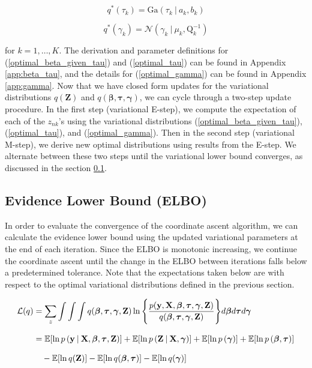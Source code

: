 \documentclass[twoside,11pt]{article}
\newcommand\given[1][]{\:#1\vert\:}
\newcommand{\boldbeta}{\boldsymbol\beta}
\newcommand{\boldgamma}{\boldsymbol\gamma}
\newcommand{\boldtau}{\boldsymbol\tau}
\newcommand{\E}{\mathbb{E}}
\newcommand{\pr}[1]{p \left( #1 \right)}
\begin{document}
\begin{equation} \label{optimal_tau}
	q^{*}(\tau_k) =  \mathrm{Ga}\left( \tau_k \given a_k, b_k \right)
\end{equation}

\begin{equation} \label{optimal_gamma}
	q^{*}(\gamma_k) = \mathcal{N} \left( \gamma_k \given \mu_k, \mathrm{Q}_k^{-1} \right)
\end{equation}

for $k = 1, \ldots, K$. The derivation and parameter definitions for (\ref{optimal_beta_given_tau}) and (\ref{optimal_tau}) can be found in Appendix \ref{app:beta_tau}, and the details for (\ref{optimal_gamma}) can be found in Appendix \ref{app:gamma}. Now that we have closed form updates for the variational distributions $q(\mathbf{Z})$ and $q(\boldbeta, \boldtau, \boldgamma)$, we can cycle through a two-step update procedure. In the first step (variational E-step), we compute the expectation of each of the $z_{nk}$'s using the variational distributions (\ref{optimal_beta_given_tau}), (\ref{optimal_tau}), and (\ref{optimal_gamma}). Then in the second step (variational M-step), we derive new optimal distributions using results from the E-step. We alternate between these two steps until the variational lower bound converges, as discussed in the section \ref{sub:elbo}. 


\subsection{Evidence Lower Bound (ELBO)} \label{sub:elbo}
In order to evaluate the convergence of the coordinate ascent algorithm, we can calculate the evidence lower bound using the updated variational parameters at the end of each iteration. Since the ELBO is monotonic increasing, we continue the coordinate ascent until the change in the ELBO between iterations falls below a predetermined tolerance. Note that the expectations taken below are with respect to the optimal variational distributions defined in the previous section.

\begin{equation} \label{eq:ELBO}
\setlength{\jot}{11pt}
\begin{split}
	\mathcal{L}(q) &= \sum_{z} \int \int \int q(\boldbeta, \boldtau, \boldgamma, \mathbf{Z})
	\ln \Bigg\{ \frac{p(\mathbf{y}, \mathbf{X}, \boldbeta, \boldtau, \boldgamma, \mathbf{Z})}{q(\boldbeta, \boldtau, \boldgamma, \mathbf{Z})}\Bigg\} d\boldbeta d\boldtau d\boldgamma \\
	&= \E[\ln\pr{\mathbf{y} \given \mathbf{X}, \boldbeta, \boldtau, \mathbf{Z}}] + 
	\E[\ln \pr{\mathbf{Z} \given \mathbf{X}, \boldgamma}] + \E[\ln \pr{\boldgamma}] + \E[\ln \pr{\boldbeta, \boldtau}] \\
	& \quad - \E[\ln q(\mathbf{Z})] - \E[\ln q(\boldbeta, \boldtau)] - \E[\ln q(\boldgamma)]
\end{split}
\end{equation}
\end{document}
